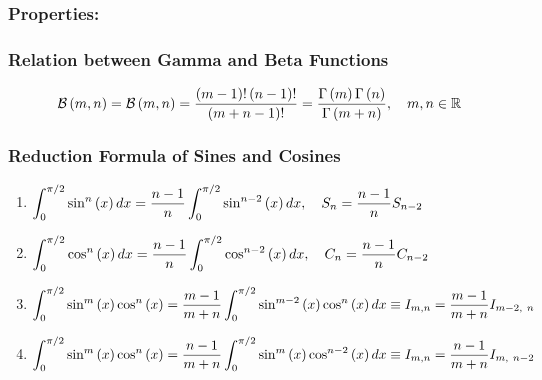 \subsubsection*{Properties:}
\begin{center}
\end{center}
\subsubsection{Relation between Gamma and Beta Functions}
\begin{equation}
    \mathcal{B}\left(m,n\right)=\mathcal{B}\left(m,n\right)=\frac{\left(m-1\right)!\left(n-1\right)!}{\left(m+n-1\right)!}=\frac{\Gamma\left(m\right)\Gamma\left(n\right)}{\Gamma\left(m+n\right)},\quad m,n\in\mathbb{R}
\end{equation}
\subsubsection*{Reduction Formula of Sines and Cosines}
\begin{enumerate}
    \item $\displaystyle\int_{0}^{\pi/2}\sin^n\left(x\right)dx=\frac{n-1}{n}\int_{0}^{\pi/2}\sin^{n-2}\left(x\right)dx,\quad S_n=\frac{n-1}{n}S_{n-2}$
    \item $\displaystyle\int_{0}^{\pi/2}\cos^n\left(x\right)dx=\frac{n-1}{n}\int_{0}^{\pi/2}\cos^{n-2}\left(x\right)dx,\quad C_n=\frac{n-1}{n}C_{n-2}$
    \item $\displaystyle\int_{0}^{\pi/2}\sin^{m}\left(x\right)\cos^{n}\left(x\right)=\frac{m-1}{m+n}\int_{0}^{\pi/2}\sin^{m-2}\left(x\right)\cos^{n}\left(x\right)dx\equiv I_{m,n}=\frac{m-1}{m+n}I_{m-2,\ n}$
    \item $\displaystyle\int_{0}^{\pi/2}\sin^{m}\left(x\right)\cos^{n}\left(x\right)=\frac{n-1}{m+n}\int_{0}^{\pi/2}\sin^{m}\left(x\right)\cos^{n-2}\left(x\right)dx\equiv I_{m,n}=\frac{n-1}{m+n}I_{m,\ n-2}$
\end{enumerate}

